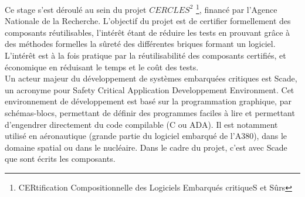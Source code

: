 


Ce stage s'est déroulé au sein du projet $CERCLES^2$ \footnote{CERtification
Compositionnelle des Logiciels Embarqués critiqueS et Sûrs}, financé par l'Agence
Nationale de la Recherche. L'objectif du projet est de certifier formellement
des composants réutilisables, l'intérêt étant de réduire les tests en prouvant
grâce à des méthodes formelles la sûreté des différentes briques formant un
logiciel. L'intérêt est à la fois pratique par la réutilisabilité des composants
certifiés, et économique en réduisant le temps et le coût des tests. \\  

Un acteur majeur du développement de systèmes embarquées critiques est Scade,
un acronyme pour Safety Critical Application Developpement Environment. Cet
environnement de développement est basé sur la programmation graphique, par
schémas-blocs, permettant de définir des programmes faciles à lire et
permettant d'engendrer directement du code compilable (C ou ADA). Il est
notamment utilisé en aéronautique (grande partie du logiciel embarqué de
l'A380), dans le domaine spatial ou dans le nucléaire. Dans le cadre du projet,
c'est avec Scade que sont écrits les composants.\\


